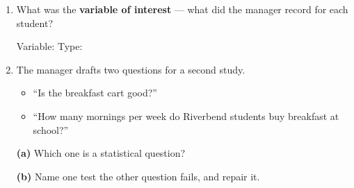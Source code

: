 \documentclass[10pt]{article}
\begin{document}
\begin{tcolorbox}[colback=white, colframe=black!40, breakable,
    title=\textbf{Part 1 --- Run the cycle},
    fonttitle=\bfseries, arc=2mm, left=3mm, right=3mm, top=2mm, bottom=2mm]
\begin{enumerate}[leftmargin=1.6em, itemsep=6pt, topsep=4pt]
  \item What was the \textbf{variable of interest} --- what did the manager
        record for each student?

        Variable:  \hfill Type: 

  \item The manager drafts two questions for a second study.

        \begin{itemize}[leftmargin=1.6em, itemsep=2pt, topsep=2pt]
          \item[\textbf{A.}] ``Is the breakfast cart good?''
          \item[\textbf{B.}] ``How many mornings per week do Riverbend students
                buy breakfast at school?''
        \end{itemize}

        \textbf{(a)} Which one is a statistical question? 

        \textbf{(b)} Name one test the other question fails, and repair it.

\end{enumerate}
\end{tcolorbox}

\vspace{0.08in}
\end{document}
